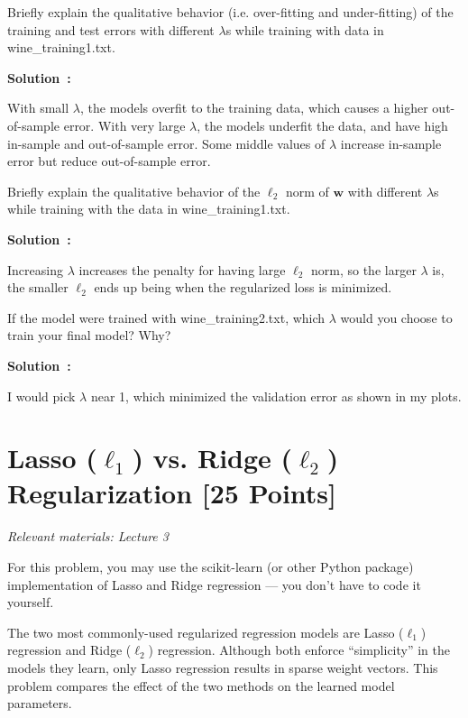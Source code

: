 \documentclass{article}
\newcounter{problem}[section]
\newenvironment{solution}[1][]
    {\par\medskip \begin{mdframed}\textbf{Solution~\Alph{problem}#1:} \begin{em}}
    {\end{em}\medskip\end{mdframed}\medskip}
\begin{document}
\problem[4]
Briefly explain the qualitative behavior (i.e. over-fitting and under-fitting) of the training and test errors with different $\lambda$s while training with data in wine\_training1.txt.

\begin{solution}
  With small $\lambda$, the models overfit to the training data, which causes a higher out-of-sample error.
  With very large $\lambda$, the models underfit the data, and have high in-sample and out-of-sample error.
  Some middle values of $\lambda$ increase in-sample error but reduce out-of-sample error.
\end{solution}

\problem[4]
Briefly explain the qualitative behavior of the $\ell_2$ norm of $\textbf{w}$ with different $\lambda$s while training with the data in wine\_training1.txt.

\begin{solution}
  Increasing $\lambda$ increases the penalty for having large $\ell_2$ norm, so the larger $\lambda$ is, the smaller $\ell_2$ ends up being when the regularized loss is minimized.
\end{solution}

\problem[4]
If the model were trained with wine\_training2.txt, which $\lambda$ would you choose to train your final model? Why?

\begin{solution}
  I would pick $\lambda$ near 1, which minimized the validation error as shown in my plots.
\end{solution}

\newpage
\section{Lasso (\texorpdfstring{$\ell_1$}{L1}) vs. Ridge (\texorpdfstring{$\ell_2$}{L2}) Regularization [25 Points]}
\textit{Relevant materials: Lecture 3}

For this problem, you may use the scikit-learn (or other Python package) implementation of Lasso and Ridge regression --- you don't have to code it yourself.

The two most commonly-used regularized regression models are Lasso ($\ell_1$) regression and Ridge ($\ell_2$) regression.
Although both enforce ``simplicity'' in the models they learn, only Lasso regression results in sparse weight vectors.
This problem compares the effect of the two methods on the learned model parameters.
\end{document}
